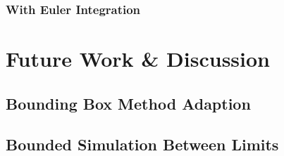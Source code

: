 		\subsubsection{With Euler Integration}

\section{Future Work \& Discussion}

	\subsection{Bounding Box Method Adaption}

	\subsection{Bounded Simulation Between Limits}


